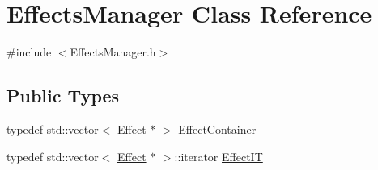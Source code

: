 \hypertarget{classEffectsManager}{}\section{Effects\+Manager Class Reference}
\label{classEffectsManager}


{\ttfamily \#include $<$Effects\+Manager.\+h$>$}

\subsection*{Public Types}
\begin{DoxyCompactItemize}
\item 
typedef std\+::vector$<$ \hyperlink{classEffect}{Effect} $\ast$ $>$ \hyperlink{classEffectsManager_ab5464241f128db0e6c30d77039f4f9ab}{Effect\+Container}
\item 
typedef std\+::vector$<$ \hyperlink{classEffect}{Effect} $\ast$ $>$\+::iterator \hyperlink{classEffectsManager_aca5fdb13fe650580299bec19f6ec6c99}{Effect\+IT}
\end{DoxyCompactItemize}
